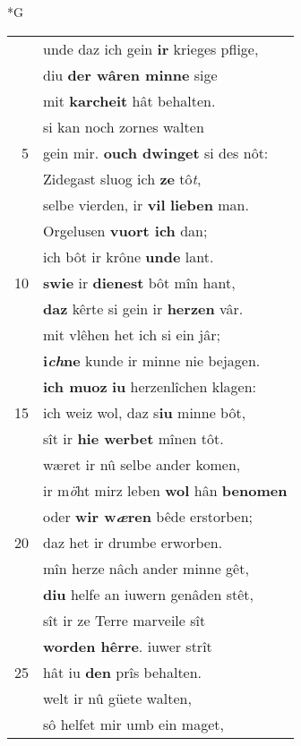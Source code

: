 \documentclass[8pt,a4paper,notitlepage]{article}
\begin{document}
\newpage
\begin{table}[ht]
\begin{minipage}[t]{0.5\linewidth}
\small
\begin{center}*G
\end{center}
\begin{tabular}{rl}
 & unde daz ich gein \textbf{ir} krieges pflige,\\ 
 & diu \textbf{der wâren minne} sige\\ 
 & mit \textbf{karcheit} hât behalten.\\ 
 & si kan noch zornes walten\\ 
5 & gein mir. \textbf{ouch dwinget} si des nôt:\\ 
 & Zidegast sluog ich \textbf{ze} tô\textit{t},\\ 
 & selbe vierden, ir \textbf{vil} \textbf{lieben} man.\\ 
 & Orgelusen \textbf{vuort ich} dan;\\ 
 & ich bôt ir krône \textbf{unde} lant.\\ 
10 & \textbf{swie} ir \textbf{dienest} bôt mîn hant,\\ 
 & \textbf{daz} kêrte si gein ir \textbf{herzen} vâr.\\ 
 & mit vlêhen het ich si ein jâr;\\ 
 & \textbf{i\textit{ch}ne} kunde ir minne nie bejagen.\\ 
 & \textbf{ich muoz} \textbf{iu} herzenlîchen klagen:\\ 
15 & ich weiz wol, daz s\textbf{iu} minne bôt,\\ 
 & sît ir \textbf{hie werbet} mînen tôt.\\ 
 & wæret ir nû selbe ander komen,\\ 
 & ir m\textit{ö}ht mirz leben \textbf{wol} hân \textbf{benomen}\\ 
 & oder \textbf{wir w\textit{æ}ren} bêde erstorben;\\ 
20 & daz het ir drumbe erworben.\\ 
 & mîn herze nâch ander minne gêt,\\ 
 & \textbf{diu} helfe an iuwern genâden stêt,\\ 
 & sît ir ze Terre marveile sît\\ 
 & \textbf{worden hêrre}. iuwer strît\\ 
25 & hât iu \textbf{den} prîs behalten.\\ 
 & welt ir nû güete walten,\\ 
 & sô helfet mir umb ein maget,\\ 

\end{tabular}
\end{minipage}
\end{table}
\end{document}
